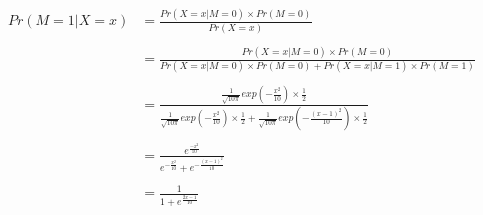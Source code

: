 \documentclass{article}
\begin{document}
\begin{enumerate}
\begin{equation}
\begin{split}
Pr( M=1| X= x) & = \frac{Pr( X = x | M=0 ) \times Pr(M=0)}{Pr(X = x)}\\ \\
		  & = \frac{Pr(X = x| M= 0 )\times Pr(M = 0)}{Pr(X=x| M = 0 ) \times Pr(M=0) + Pr(X=x| M = 1 ) \times Pr(M = 1)}\\ \\
		& =\frac{ \frac{1}{\sqrt{10\pi}}exp(-\frac{x^2}{10}) \times \frac{1}{2}}{ \frac{1}{\sqrt{10\pi}}exp(-\frac{x^2}{10}) \times 				\frac{1}{2} +  \frac{1}{\sqrt{10\pi}}exp(-\frac{(x-1)^2}{10}) \times \frac{1}{2}} \\ \\
		& = \frac{e^{\frac{-x^{2}}{10}}}{e^{-\frac{x^2}{10}}+e^{-\frac{(x-1)^2}{10}}}\\ \\
		& = \frac{1}{1+e^\frac{{2x-1}}{10}}
\end{split}
\end{equation}




\end{enumerate}
\end{document}

